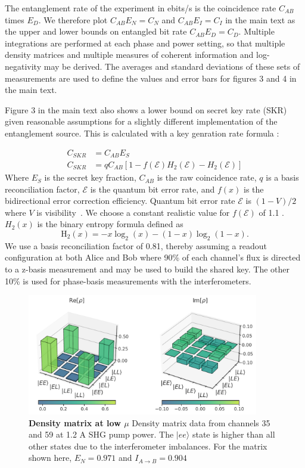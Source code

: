 \documentclass[11pt]{caltech_thesis} %
\begin{document}
The entanglement rate of the experiment in ebits/s is the coincidence rate $C_{AB}$ times $E_D$. We therefore plot $C_{AB}E_N = C_N$ and $C_{AB}E_I = C_I$ in the main text as the upper and lower bounds on entangled bit rate $C_{AB}E_D = C_D$. Multiple integrations are performed at each phase and power setting, so that multiple density matrices and multiple measures of coherent information and log-negativity may be derived. The averages and standard deviations of these sets of measurements are used to define the values and error bars for figures 3 and 4 in the main text.

Figure 3 in the main text also shows a lower bound on secret key rate (SKR) given reasonable assumptions for a slightly different implementation of the entanglement source. This is calculated with a key genration rate formula \cite{ma2007quantum}:

\begin{align}
C_{SKR} &= C_{AB} E_S \\
C_{SKR} &= q C_{AB}[1-f(\mathcal{E}) H_2(\mathcal{E})-H_2(\mathcal{E})]
\end{align}
Where $E_S$ is the secret key fraction, $C_{AB}$ is the raw coincidence rate, $q$ is a basis reconciliation factor, $\mathcal{E}$ is the quantum bit error rate, and $f(x)$ is the bidirectional error correction efficiency. Quantum bit error rate $\mathcal{E}$ is $(1-V)/2$ where $V$ is visibility~\cite{Kim2022}. We choose a constant realistic value for $f(\mathcal{E})$ of 1.1 \cite{ElkoussReconciliation2010}. $H_2(x)$ is the binary entropy formula defined as
$$\mathrm{H}_2(x)=-x \log _2(x)-(1-x) \log _2(1-x).$$
We use a basis reconciliation factor of 0.81, thereby assuming a readout configuration at both Alice and Bob where 90\% of each channel's flux is directed to a z-basis measurement and may be used to build the shared key. The other 10\% is used for phase-basis measurements with the interferometers.

\hypertarget{fig:density_matrix}{%
\begin{figure}
\centering
\includegraphics[width=0.9\textwidth,height=\textheight]{./chapter_05/figs/density_matrix_light.pdf}
\caption[{Density matrix at low \(\mu\)}]{\textbf{Density matrix at low $\mu$} Density matrix data from channels 35 and 59 at 1.2 A SHG pump power. The $|ee\rangle$ state is higher than all other states due to the interferometer imbalances. For the matrix shown here, $E_N = 0.971$ and $I_{A\rightarrow B} = 0.904$}
\label{fig:density_matrix}
\end{figure}
}
\end{document}
